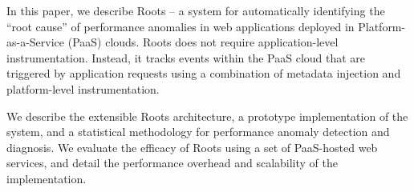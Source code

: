 In this paper, we describe Roots -- a system for automatically identifying the
``root cause'' of performance anomalies in web applications deployed
in Platform-as-a-Service (PaaS) clouds.
Roots does not require
application-level instrumentation.  Instead, it tracks events within the PaaS
cloud that are triggered by application requests using a
combination of metadata injection and platform-level instrumentation.

We describe the extensible Roots architecture, a prototype implementation 
of the system, and a statistical methodology for performance anomaly
detection and diagnosis.  We evaluate the efficacy of Roots
using a set of PaaS-hosted web services, and detail the performance
overhead and scalability of the implementation.

